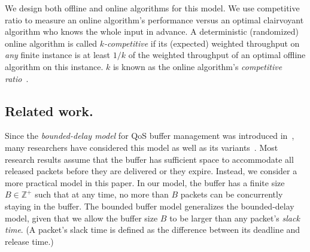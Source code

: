 \documentclass[final, 11pt]{article}
\begin{document}
We design both offline and online algorithms for this model.  We use competitive ratio to measure an online algorithm's performance versus an optimal clairvoyant algorithm who knows the whole input in advance. A deterministic (randomized) online algorithm is called {\em $k$-competitive} if its (expected) weighted throughput on {\em any} finite instance is at least $1 / k$ of the weighted throughput of an optimal offline algorithm on this instance. $k$ is known as the online algorithm's {\em competitive ratio}~\cite{BY98}.



\subsection{Related work.}

Since the {\em bounded-delay model} for QoS buffer management was introduced in~\cite{KLMPSS04, H01}, many researchers have considered this model as well as its variants~\cite{KLMPSS04, H01, CF03, CCFJST06, CJST07, LSS05, LSS07, EW07}. Most research results assume that the buffer has sufficient space to accommodate all released packets before they are delivered or they expire. Instead, we consider a more practical model in this paper. In our model, the buffer has a finite size $B \in \mathbb Z^+$ such that at any time, no more than $B$ packets can be concurrently staying in the buffer. The bounded buffer model generalizes the bounded-delay model, given that we allow the buffer size $B$ to be larger than any packet's {\em slack time}. (A packet's slack time is defined as the difference between its deadline and release time.)
\end{document}
